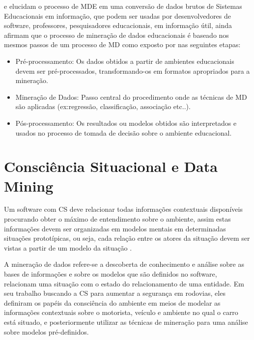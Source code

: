 \documentclass[12pt]{article}
\begin{document}
\cite{Garcia_et_al_2011} e \cite{Santos2016} elucidam o processo de MDE em uma conversão de dados brutos de Sistemas Educacionais em informação, que podem ser usadas por desenvolvedores de software, professores, pesquisadores educacionais, em informação útil, \cite{Garcia_et_al_2011} ainda afirmam que o processo de mineração de dados educacionais é baseado nos mesmos passos de um processo de MD como exposto por \cite{Romero_Ventura_Bra_2004} nas seguintes etapas:

\begin{itemize}
	
	\item Pré-processamento: Os dados obtidos a partir de ambientes educacionais devem ser pré-processados, transformando-os em formatos apropriados para a mineração.
	\item Mineração de Dados: Passo central do procedimento onde as técnicas de MD são aplicadas (ex:regressão, classificação, associação etc..).
	\item Pós-processamento: Os resultados ou modelos obtidos são interpretados e usados no processo de tomada de decisão sobre o ambiente educacional.
	
\end{itemize}

\section{Consciência Situacional e Data Mining}

Um software com CS deve relacionar todas informações contextuais disponíveis procurando obter o máximo de entendimento sobre o ambiente, assim estas informações devem ser organizadas em modelos mentais em determinadas situações prototípicas, ou seja, cada relação entre os atores da situação devem ser vistas a partir de um modelo da situação \cite{Berti2017}. 

A mineração de dados refere-se a descoberta de conhecimento e análise sobre as bases de informações e sobre os modelos que são definidos no software, \cite{Krishnaswamy_et_al_2005}	relacionam uma situação com o estado do relacionamento de uma entidade. Em seu trabalho buscando a CS para aumentar a segurança em rodovias, eles definiram os papéis da consciência do ambiente em meios de modelar as informações contextuais sobre o motorista, veículo e ambiente no qual o carro está situado, e posteriormente utilizar as técnicas de mineração para uma análise sobre modelos pré-definidos.
\end{document}

